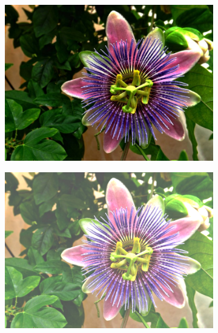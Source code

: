 \documentclass{article}
\begin{document}
\begin{figure}[h]
\begin{subfigure}{.3\textwidth}
  \centering
  \includegraphics[width=0.97\linewidth]{_Figures/sample_2.jpg}
  \caption{}
  \label{fig:brigth_raw_2}
\end{subfigure}%
\begin{subfigure}{.3\textwidth}
  \centering
  \includegraphics[width=0.97\linewidth]{_Figures/sample_2_brigthness_low.png}
    \caption{}
      \label{fig:brigth_low_2}
\end{subfigure}
\begin{subfigure}{.3\textwidth}
  \centering

\end{subfigure}
\end{figure}
\end{document}
